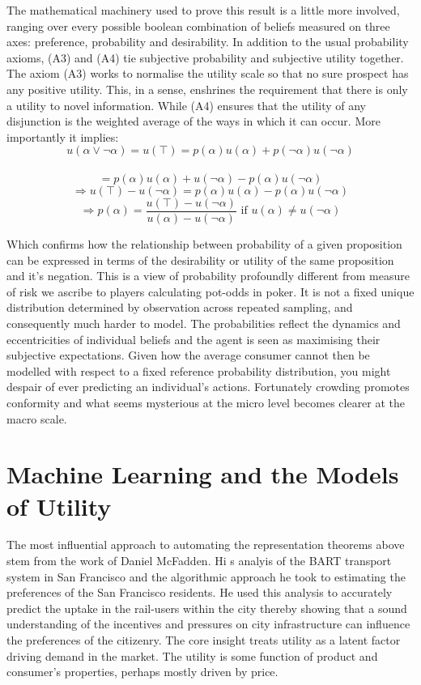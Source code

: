 \documentclass[]{tufte-book}
\theoremstyle{definition}
\theoremstyle{definition}
\theoremstyle{definition}
\theoremstyle{remark}
\begin{document}
The mathematical machinery used to prove this result is a little more involved, ranging over every possible boolean combination of beliefs measured on three axes: preference, probability and desirability. In addition to the usual probability axioms, (A3) and (A4) tie subjective probability and subjective utility together. The axiom (A3) works to normalise the utility scale so that no sure prospect has any positive utility. This, in a sense, enshrines the requirement that there is only a utility to novel information. While (A4) ensures that the utility of any disjunction is the weighted average of the ways in which it can occur. More importantly it implies:
\[u(\alpha \vee \neg\alpha) = u(\top) = p(\alpha)u(\alpha) + p(\neg\alpha)u(\neg\alpha)\]\\
\[= p(\alpha)u(\alpha) + u(\neg\alpha) - p(\alpha)u(\neg\alpha) \]
\[ \Rightarrow u(\top) - u(\neg\alpha) = p(\alpha)u(\alpha)  - p(\alpha)u(\neg\alpha)\]
\[ \Rightarrow p(\alpha) = \frac{u(\top) - u(\neg\alpha)}{ u(\alpha)  - u(\neg\alpha)} \text{  if } u(\alpha) \neq u(\neg\alpha) \]

Which confirms how the relationship between probability of a given proposition can be expressed in terms of the desirability or utility of the same proposition and it's negation. This is a view of probability profoundly different from measure of risk we ascribe to players calculating pot-odds in poker. It is not a fixed unique distribution determined by observation across repeated sampling, and consequently much harder to model. The probabilities reflect the dynamics and eccentricities of individual beliefs and the agent is seen as maximising their subjective expectations. Given how the average consumer cannot then be modelled with respect to a fixed reference probability distribution, you might despair of ever predicting an individual's actions. Fortunately crowding promotes conformity and what seems mysterious at the micro level becomes clearer at the macro scale.

\hypertarget{machine-learning-and-the-models-of-utility}{%
\section{Machine Learning and the Models of Utility}\label{machine-learning-and-the-models-of-utility}}

The most influential approach to automating the representation theorems above stem from the work of Daniel McFadden. Hi s analyis of the BART transport system in San Francisco and the algorithmic approach he took to estimating the preferences of the San Francisco residents. He used this analysis to accurately predict the uptake in the rail-users within the city thereby showing that a sound understanding of the incentives and pressures on city infrastructure can influence the preferences of the citizenry. The core insight treats utility as a latent factor driving demand in the market. The utility is some function of product and consumer's properties, perhaps mostly driven by price.
\end{document}
